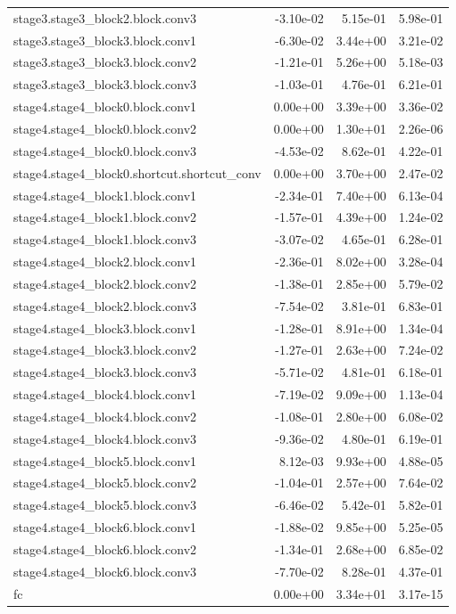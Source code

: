 \begin{longtable}{lrrr}
stage3.stage3_block2.block.conv3 & -3.10e-02 & 5.15e-01 & 5.98e-01 \\
stage3.stage3_block3.block.conv1 & -6.30e-02 & 3.44e+00 & 3.21e-02 \\
stage3.stage3_block3.block.conv2 & -1.21e-01 & 5.26e+00 & 5.18e-03 \\
stage3.stage3_block3.block.conv3 & -1.03e-01 & 4.76e-01 & 6.21e-01 \\
stage4.stage4_block0.block.conv1 & 0.00e+00 & 3.39e+00 & 3.36e-02 \\
stage4.stage4_block0.block.conv2 & 0.00e+00 & 1.30e+01 & 2.26e-06 \\
stage4.stage4_block0.block.conv3 & -4.53e-02 & 8.62e-01 & 4.22e-01 \\
stage4.stage4_block0.shortcut.shortcut_conv & 0.00e+00 & 3.70e+00 & 2.47e-02 \\
stage4.stage4_block1.block.conv1 & -2.34e-01 & 7.40e+00 & 6.13e-04 \\
stage4.stage4_block1.block.conv2 & -1.57e-01 & 4.39e+00 & 1.24e-02 \\
stage4.stage4_block1.block.conv3 & -3.07e-02 & 4.65e-01 & 6.28e-01 \\
stage4.stage4_block2.block.conv1 & -2.36e-01 & 8.02e+00 & 3.28e-04 \\
stage4.stage4_block2.block.conv2 & -1.38e-01 & 2.85e+00 & 5.79e-02 \\
stage4.stage4_block2.block.conv3 & -7.54e-02 & 3.81e-01 & 6.83e-01 \\
stage4.stage4_block3.block.conv1 & -1.28e-01 & 8.91e+00 & 1.34e-04 \\
stage4.stage4_block3.block.conv2 & -1.27e-01 & 2.63e+00 & 7.24e-02 \\
stage4.stage4_block3.block.conv3 & -5.71e-02 & 4.81e-01 & 6.18e-01 \\
stage4.stage4_block4.block.conv1 & -7.19e-02 & 9.09e+00 & 1.13e-04 \\
stage4.stage4_block4.block.conv2 & -1.08e-01 & 2.80e+00 & 6.08e-02 \\
stage4.stage4_block4.block.conv3 & -9.36e-02 & 4.80e-01 & 6.19e-01 \\
stage4.stage4_block5.block.conv1 & 8.12e-03 & 9.93e+00 & 4.88e-05 \\
stage4.stage4_block5.block.conv2 & -1.04e-01 & 2.57e+00 & 7.64e-02 \\
stage4.stage4_block5.block.conv3 & -6.46e-02 & 5.42e-01 & 5.82e-01 \\
stage4.stage4_block6.block.conv1 & -1.88e-02 & 9.85e+00 & 5.25e-05 \\
stage4.stage4_block6.block.conv2 & -1.34e-01 & 2.68e+00 & 6.85e-02 \\
stage4.stage4_block6.block.conv3 & -7.70e-02 & 8.28e-01 & 4.37e-01 \\
fc & 0.00e+00 & 3.34e+01 & 3.17e-15 \\
\end{longtable}

